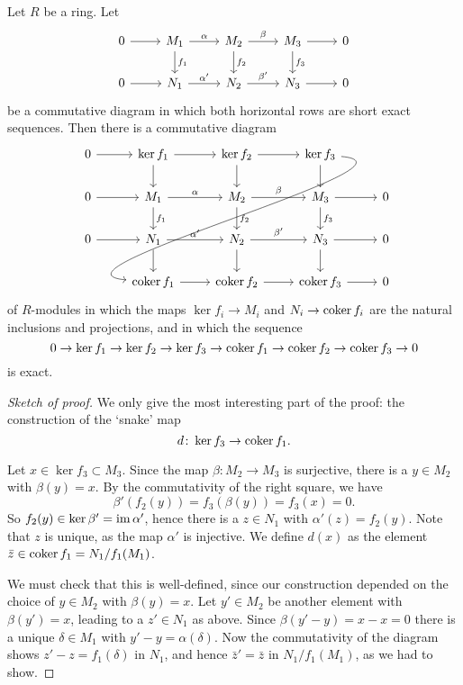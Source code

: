 \begin{theorem}\label{thm:snake-lemma}
Let $R$ be a ring. Let
\[
\begin{tikzcd}
 0 \arrow{r} 
 	& M_1 \arrow{r}{\alpha} \arrow{d}{f_1}
 	& M_2 \arrow{r}{\beta} \arrow{d}{f_2}
 	& M_3 \arrow{r} \arrow{d}{f_3}
	& 0 \\
0 \arrow{r}
	& N_1 \arrow{r}{\alpha'}
	& N_2 \arrow{r}{\beta'}
	& N_3 \arrow{r}
	& 0
\end{tikzcd}
\]
be a commutative diagram in which both horizontal rows are short exact sequences. Then there is 
a commutative diagram
\[
\begin{tikzcd}
0 \arrow{r} 
 	& \ker f_1 \arrow{d} \arrow{r}
 	& \ker f_2 \arrow{d} \arrow{r}
 	& \ker f_3 \arrow{d} \arrow[out=-5, in=175]{dddll}
	&  \\
 0 \arrow{r} 
 	& M_1 \arrow{r}{\alpha} \arrow{d}{f_1}
 	& M_2 \arrow{r}{\beta} \arrow{d}{f_2}
 	& M_3 \arrow{r} \arrow{d}{f_3}
	& 0 \\
0 \arrow{r}
	& N_1 \arrow{r}{\alpha'} \arrow{d}
	& N_2 \arrow{r}{\beta'} \arrow{d}
	& N_3 \arrow{r} \arrow{d}
	& 0 \\
	& \coker f_1 \arrow{r}
	& \coker f_2 \arrow{r}
	& \coker f_3 \arrow{r} & 0
\end{tikzcd}
\]
of $R$-modules in which the maps $\ker f_i\to M_i$ and $N_i \to \operatorname{coker} f_i$ are the natural inclusions and projections, and
in which the sequence
\[
	0 \to \ker f_1 \to \ker f_2 \to \ker f_3 \to \operatorname{coker} f_1 \to \operatorname{coker} f_2 \to \operatorname{coker} f_3 \to 0
\]
is exact.
\end{theorem}



\begin{proof}[Sketch of proof]
We only give the most interesting part of the proof: the construction of the `snake' map
\[
	d\colon \ker f_3 \to \operatorname{coker} f_1.
\]

Let $x\in \ker f_3 \subset M_3$.  Since the map $\beta\colon M_2\to M_3$ is surjective, there is a $y\in M_2$ with $\beta(y)=x$. By the commutativity of the right square, we have
\[
	\beta'(f_2(y)) = f_3(\beta(y)) = f_3(x) = 0.
\]
So $f_2(y) \in \ker \beta' = \operatorname{im} \alpha'$, hence there is a $z\in N_1$ with $\alpha'(z)=f_2(y)$. Note that $z$ is unique, as the map $\alpha'$ is injective. We define $d(x)$ as the element $\bar{z} \in \operatorname{coker} f_1 = N_1/f_1(M_1)$.

We must check that this is well-defined, since our construction depended on the choice of $y\in M_2$ with $\beta(y)=x$. Let $y'\in M_2$ be another element with $\beta(y')=x$, leading to a $z'\in N_1$ as above.
Since $\beta(y'-y)=x-x=0$ there is a unique $\delta \in M_1$  with $y' -y = \alpha(\delta)$. Now the commutativity of the diagram shows $z'-z=f_1(\delta)$ in $N_1$, and hence $\bar{z}' = \bar{z}$ in $N_1/f_1(M_1)$, as we had to show.
\end{proof}

